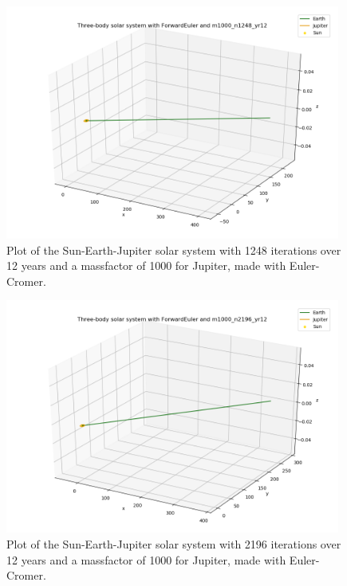 \documentclass{article}
\begin{document}
    \begin{figure}[H]
        \centering
        \includegraphics[width = 11cm]{img/plot3D_S_E_J_F_m1000_n1248_yr12.png}
        \caption{Plot of the Sun-Earth-Jupiter solar system with 1248 iterations over 12 years and a massfactor of 1000 for Jupiter, made with Euler-Cromer.}
        \label{fig:plot3D_S_E_J_F_m1000_n1248_yr12}
    \end{figure}

    \begin{figure}[H]
        \centering
        \includegraphics[width = 11cm]{img/plot3D_S_E_J_F_m1000_n2196_yr12.png}
        \caption{Plot of the Sun-Earth-Jupiter solar system with 2196 iterations over 12 years and a massfactor of 1000 for Jupiter, made with Euler-Cromer.}
        \label{fig:plot3D_S_E_J_F_m1000_n2196_yr12}
    \end{figure}
\end{document}
